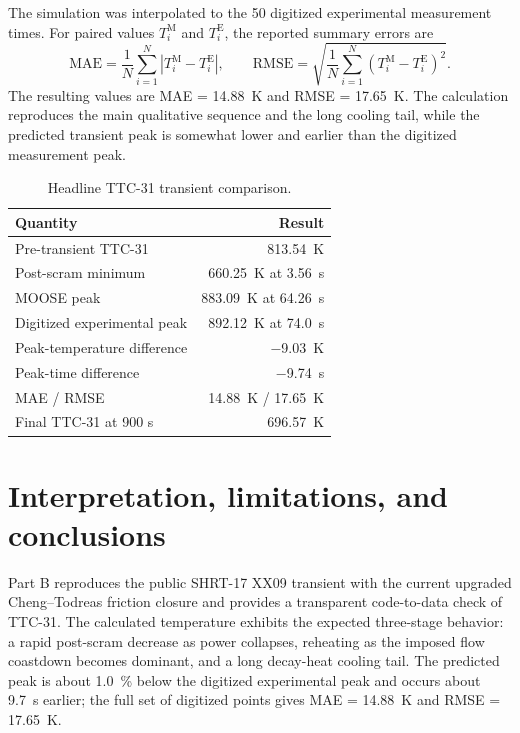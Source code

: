 \documentclass[10pt,a4paper]{article}
\begin{document}
The simulation was interpolated to the 50 digitized experimental measurement times. For paired values $T_i^{\mathrm{M}}$ and $T_i^{\mathrm{E}}$, the reported summary errors are
\begin{equation}
\mathrm{MAE}=\frac{1}{N}\sum_{i=1}^{N}\left|T_i^{\mathrm{M}}-T_i^{\mathrm{E}}\right|,
\qquad
\mathrm{RMSE}=\sqrt{\frac{1}{N}\sum_{i=1}^{N}\left(T_i^{\mathrm{M}}-T_i^{\mathrm{E}}\right)^2}.
\end{equation}
The resulting values are MAE = \SI{14.88}{K} and RMSE = \SI{17.65}{K}. The calculation reproduces the main qualitative sequence and the long cooling tail, while the predicted transient peak is somewhat lower and earlier than the digitized measurement peak.

\begin{table}[H]
\centering\small
\caption{Headline TTC-31 transient comparison.}
\begin{tabular}{@{}lr@{}}
\toprule
Quantity & Result \\
\midrule
Pre-transient TTC-31 & \SI{813.54}{K} \\
Post-scram minimum & \SI{660.25}{K} at \SI{3.56}{s} \\
MOOSE peak & \SI{883.09}{K} at \SI{64.26}{s} \\
Digitized experimental peak & \SI{892.12}{K} at \SI{74.0}{s} \\
Peak-temperature difference & \SI{-9.03}{K} \\
Peak-time difference & \SI{-9.74}{s} \\
MAE / RMSE & \SI{14.88}{K} / \SI{17.65}{K} \\
Final TTC-31 at 900 s & \SI{696.57}{K} \\
\bottomrule
\end{tabular}
\end{table}

\section{Interpretation, limitations, and conclusions}

Part B reproduces the public SHRT-17 XX09 transient with the current upgraded Cheng--Todreas friction closure and provides a transparent code-to-data check of TTC-31. The calculated temperature exhibits the expected three-stage behavior: a rapid post-scram decrease as power collapses, reheating as the imposed flow coastdown becomes dominant, and a long decay-heat cooling tail. The predicted peak is about \SI{1.0}{\percent} below the digitized experimental peak and occurs about \SI{9.7}{s} earlier; the full set of digitized points gives MAE = \SI{14.88}{K} and RMSE = \SI{17.65}{K}.
\end{document}
